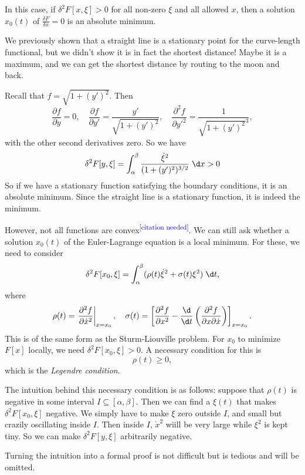 \documentclass[a4paper]{article}
\begin{document}
In this case, if $\delta^2 F[x, \xi] > 0$ for all non-zero $\xi$ and all allowed $x$, then a solution $x_0(t)$ of $\frac{\delta F}{\delta x} = 0$ is an absolute minimum.

\begin{eg}
  We previously shown that a straight line is a stationary point for the curve-length functional, but we didn't show it is in fact the shortest distance! Maybe it is a maximum, and we can get the shortest distance by routing to the moon and back.

  Recall that $f = \sqrt{1 + (y')^2}$. Then
  \[
    \frac{\partial f}{\partial y} = 0,\quad \frac{\partial f}{\partial y'} = \frac{y'}{\sqrt{1 + (y')^2}},\quad \frac{\partial^2 f}{\partial y'^2} = \frac{1}{\sqrt{1 + (y')^2}^3},
  \]
  with the other second derivatives zero. So we have
  \[
    \delta ^2 F[y, \xi] = \int_\alpha^\beta \frac{\dot{\xi}^2}{(1 + (y')^2)^{3/2}}\;\d x > 0
  \]
  So if we have a stationary function satisfying the boundary conditions, it is an absolute minimum. Since the straight line is a stationary function, it is indeed the minimum.
\end{eg}
However, not all functions are convex\textsuperscript{[\textcolor{blue}{citation needed}]}. We can still ask whether a solution $x_0(t)$ of the Euler-Lagrange equation is a local minimum. For these, we need to consider
\[
  \delta^2 F[x_0, \xi] = \int_\alpha^\beta (\rho(t)\dot{\xi}^2 + \sigma(t) \xi^2)\;\d t,
\]
where
\[
  \rho(t) = \left.\frac{\partial^2 f}{\partial \dot{x}^2}\right|_{x = x_0},\quad
  \sigma(t) = \left[\frac{\partial^2 f}{\partial x^2} - \frac{\d}{\d t}\left(\frac{\partial^2 f}{\partial x \partial \dot{x}}\right)\right]_{x = x_0}.
\]
This is of the same form as the Sturm-Liouville problem. For $x_0$ to minimize $F[x]$ locally, we need $\delta^2 F[x_0, \xi] > 0$. A necessary condition for this is
\[
  \rho(t) \geq 0,
\]
which is the \emph{Legendre condition}.

The intuition behind this necessary condition is as follows: suppose that $\rho(t)$ is negative in some interval $I\subseteq [\alpha, \beta]$. Then we can find a $\xi(t)$ that makes $\delta^2 F[x_0, \xi]$ negative. We simply have to make $\xi$ zero outside $I$, and small but crazily oscillating inside $I$. Then inside $I$, $\dot{x}^2$ wiill be very large while $\xi^2$ is kept tiny. So we can make $\delta^2 F[y, \xi]$ arbitrarily negative.

Turning the intuition into a formal proof is not difficult but is tedious and will be omitted.
\end{document}
